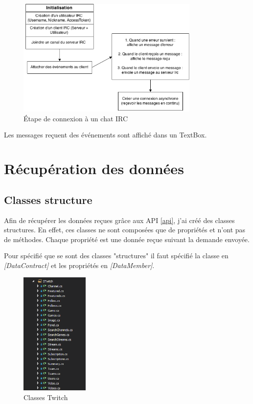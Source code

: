 \documentclass[11pt]{report} %
\begin{document}
		\begin{figure}[h]
			\center
			\includegraphics[width=0.8\textwidth]{../img/IrcChat.png}
			\caption{Étape de connexion à un chat IRC}
			\label{IrcChat}
		\end{figure}
		
		Les messages reçuent des événements sont affiché dans un TextBox.

	\newpage
	\section{Récupération des données}
		\subsection{Classes structure}
		Afin de récupérer les données reçues grâce aux API \ref{api}, j'ai créé des classes structures. En effet, ces classes ne sont composées que de propriétés et n'ont pas de méthodes. Chaque propriété est une donnée reçue suivant la demande envoyée.
		
		Pour spécifié que se sont des classes "structures" il faut spécifié la classe en \textit{[DataContract]} et les propriétés en \textit{[DataMember]}.
		
		\begin{figure}[h]
			\center
			\includegraphics[width=0.3\textwidth]{../img/STwitch.png}
			\caption{Classes Twitch}
			\label{Twitch class}
		\end{figure}
		
\end{document}
